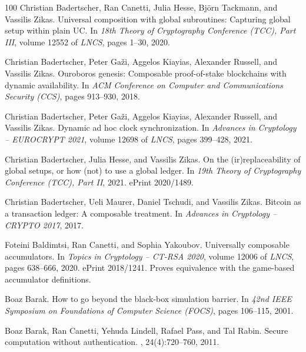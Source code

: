 \documentclass[11pt,a4paper]{article}
\begin{document}
\begin{thebibliography}{100}
Christian Badertscher, Ran Canetti, Julia Hesse, Bj{\"o}rn Tackmann, and
  Vassilis Zikas.
\newblock Universal composition with global subroutines: Capturing global setup
  within plain {UC}.
\newblock In {\em 18th Theory of Cryptography Conference (TCC), Part III},
  volume 12552 of {\em LNCS}, pages 1--30, 2020.

Christian Badertscher, Peter Ga{\v z}i, Aggelos Kiayias, Alexander Russell, and
  Vassilis Zikas.
\newblock Ouroboros genesis: Composable proof-of-stake blockchains with dynamic
  availability.
\newblock In {\em ACM Conference on Computer and Communications Security
  (CCS)}, pages 913--930, 2018.

Christian Badertscher, Peter Ga{\v z}i, Aggelos Kiayias, Alexander Russell, and
  Vassilis Zikas.
\newblock Dynamic ad hoc clock synchronization.
\newblock In {\em Advances in Cryptology -- EUROCRYPT 2021}, volume 12698 of
  {\em LNCS}, pages 399--428, 2021.

Christian Badertscher, Julia Hesse, and Vassilis Zikas.
\newblock On the (ir)replaceability of global setups, or how (not) to use a
  global ledger.
\newblock In {\em 19th Theory of Cryptography Conference (TCC), Part II}, 2021.
\newblock ePrint 2020/1489.

Christian Badertscher, Ueli Maurer, Daniel Tschudi, and Vassilis Zikas.
\newblock Bitcoin as a transaction ledger: A composable treatment.
\newblock In {\em Advances in Cryptology -- CRYPTO 2017}, 2017.

Foteini Baldimtsi, Ran Canetti, and Sophia Yakoubov.
\newblock Universally composable accumulators.
\newblock In {\em Topics in Cryptology -- CT-RSA 2020}, volume 12006 of {\em
  LNCS}, pages 638--666, 2020.
\newblock ePrint 2018/1241. Proves equivalence with the game-based accumulator
  definitions.

Boaz Barak.
\newblock How to go beyond the black-box simulation barrier.
\newblock In {\em 42nd IEEE Symposium on Foundations of Computer Science
  (FOCS)}, pages 106--115, 2001.

Boaz Barak, Ran Canetti, Yehuda Lindell, Rafael Pass, and Tal Rabin.
\newblock Secure computation without authentication.
, 24(4):720--760, 2011.


\end{thebibliography}
\end{document}
